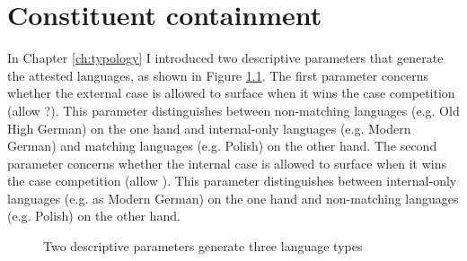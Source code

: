 
\chapter{Constituent containment}\label{ch:relativization}

In Chapter \ref{ch:typology} I introduced two descriptive parameters that generate the attested languages, as shown in Figure \ref{fig:two-parameters}.
The first parameter concerns whether the external case is allowed to surface when it wins the case competition (allow ?). This parameter distinguishes between non-matching languages (e.g. Old High German) on the one hand and internal-only languages (e.g. Modern German) and matching languages (e.g. Polish) on the other hand.
The second parameter concerns whether the internal case is allowed to surface when it wins the case competition (allow ). This parameter distinguishes between internal-only languages (e.g. as Modern German) on the one hand and non-matching languages (e.g. Polish) on the other hand.

\begin{figure}[H]
  \centering
    \footnotesize{
    }
    \caption{Two descriptive parameters generate three language types}
    \label{fig:two-parameters}
\end{figure}

